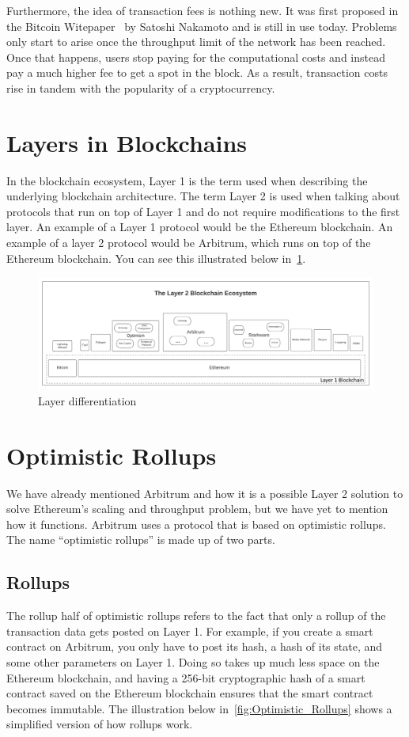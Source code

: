 \documentclass[a4paper,oneside,openright,11pt]{report}
\begin{document}
Furthermore, the idea of transaction fees is nothing new. It was first proposed in the 
Bitcoin Witepaper~\cite{nakamoto2008bitcoin} by Satoshi Nakamoto and is still in use
today. Problems only start to arise once the throughput limit of the network has been reached. 
Once that happens, users stop paying for the computational costs and instead pay a much higher 
fee to get a spot in the block. As a result, transaction costs rise in tandem with the popularity 
of a cryptocurrency.

\section{Layers in Blockchains}
In the blockchain ecosystem, Layer 1 is the term used when describing the underlying blockchain 
architecture. The term Layer 2 is used when talking about protocols that run on top of Layer 1 
and do not require modifications to the first layer. An example of a Layer 1 protocol would be the 
Ethereum blockchain. An example of a layer 2 protocol would be Arbitrum, which runs on top of 
the Ethereum blockchain. You can see this illustrated below in~\cref{fig:Layer1_Layer2_comparison}.

\begin{figure}
	\centering
	\includegraphics[scale=0.8]{./Pictures/Layer-2-Ecosystem-Map.png}
	\caption{Layer differentiation}
	\label{fig:Layer1_Layer2_comparison}
\end{figure}

\section{Optimistic Rollups}
We have already mentioned Arbitrum and how it is a possible Layer 2 solution to solve Ethereum's 
scaling and throughput problem, but we have yet to mention how it functions. 
Arbitrum uses a protocol that is based on optimistic rollups.
The name ``optimistic rollups'' is made up of two parts.

\subsection{Rollups}
The rollup half of optimistic rollups refers to the fact that only a rollup of the transaction data
gets posted on Layer 1. For example, if you create a smart contract on Arbitrum, you only have 
to post its hash, a hash of its state, and some other parameters on Layer 1. Doing so takes up 
much less space on the Ethereum blockchain, and having a 256-bit cryptographic hash of a smart
contract saved on the Ethereum blockchain ensures that the smart contract becomes immutable.
The illustration below in~\cref{fig:Optimistic_Rollups} shows a simplified version of how rollups 
work.
\end{document}

